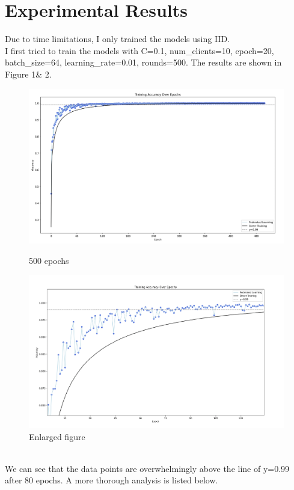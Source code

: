 \documentclass[a4paper,12pt]{article}
\begin{document}
\section{Experimental Results}
Due to time limitations, I only trained the models using IID. 
\\
I first tried to train the models with C=0.1, num\_clients=10, epoch=20, batch\_size=64, learning\_rate=0.01, rounds=500.
The results are shown in Figure 1\& 2.
\begin{figure}[htbp]
    \centering
    \begin{minipage}[t]{0.49\textwidth}
        \centering
        \includegraphics[width=1\textwidth]{1.png} %
	      \vspace{-0.8cm}
        \caption{500 epochs}
    \end{minipage}
    \hfill
    \begin{minipage}[t]{0.49\textwidth}
        \centering
        \includegraphics[width=1\textwidth]{2.png} %
	      \vspace{-0.8cm}
        \caption{Enlarged figure}
\end{minipage}
\end{figure}
\\We can see that the data points are overwhelmingly above the line of y=0.99
 after 80 epochs. A more thorough analysis is listed below.
\end{document}
